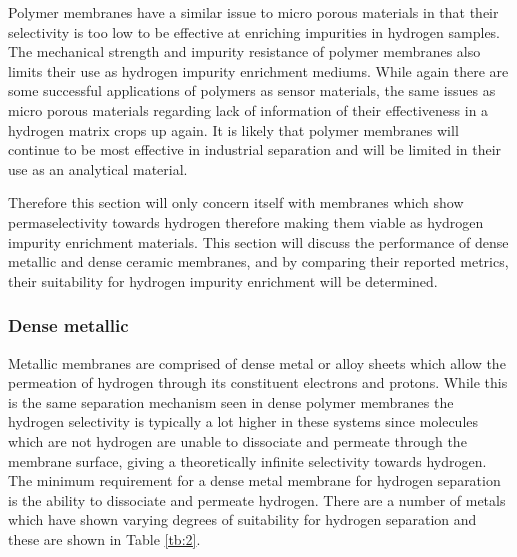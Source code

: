 Polymer membranes have a similar issue to micro porous materials in that their selectivity 
is too low to be effective at enriching impurities in hydrogen samples. The mechanical 
strength and impurity resistance of polymer membranes also limits their use as hydrogen 
impurity enrichment mediums. While again there are some successful applications of polymers 
as sensor materials, the same issues as micro porous materials regarding lack of information 
of their effectiveness in a hydrogen matrix crops up again. It is likely that polymer 
membranes will continue to be most effective in industrial separation and will be limited in 
their use as an analytical material. 

Therefore this section will only concern itself with membranes which show permaselectivity towards hydrogen therefore making them viable as hydrogen impurity enrichment materials. This section will discuss the performance of dense metallic and dense ceramic membranes, and by comparing their reported metrics, their suitability for hydrogen impurity enrichment will be determined.

\subsubsection{Dense metallic}\label{pdreview}
Metallic membranes are comprised of dense metal or alloy sheets which allow the permeation 
of hydrogen through its constituent electrons and protons. While this is the same separation 
mechanism seen in dense polymer membranes the hydrogen selectivity is typically a lot higher 
in these systems since molecules which are not hydrogen are unable to dissociate and permeate 
through the membrane surface, giving a theoretically infinite selectivity towards hydrogen. 
The minimum requirement for a dense metal membrane for hydrogen separation is the ability to 
dissociate and permeate hydrogen. There are a number of metals which have shown varying 
degrees of suitability for hydrogen separation and these are shown in Table \ref{tb:2}.




